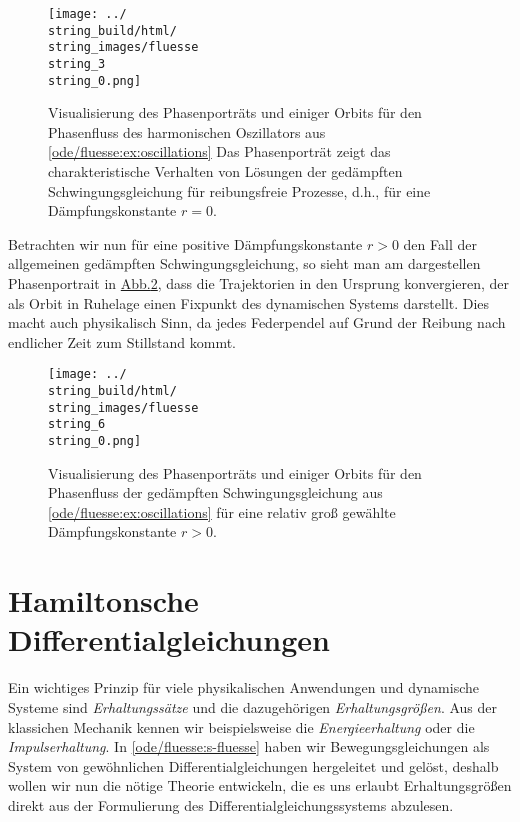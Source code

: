\documentclass[letterpaper,10pt,german]{jupyterBook}
\begin{document}
\begin{figure}[htbp]
\centering



\noindent\texttt{[image: ../\\string\_build/html/\\string\_images/fluesse\\string\_3\\string\_0.png]}

\caption{Visualisierung des Phasenporträts und einiger Orbits für den Phasenfluss des harmonischen Oszillators aus \cref{ode/fluesse:ex:oscillations}  Das Phasenporträt zeigt das charakteristische Verhalten von Lösungen der gedämpften Schwingungsgleichung für reibungsfreie Prozesse, d.h., für eine Dämpfungskonstante \(r = 0\).}\label{\detokenize{ode/fluesse:fig-harmonic-oscillator}}\end{figure}

\par
Betrachten wir nun für eine positive Dämpfungskonstante \(r > 0\) den Fall der allgemeinen gedämpften Schwingungsgleichung, so sieht man am dargestellen Phasenportrait in \hyperref[\detokenize{ode/fluesse:fig-damped-oscillator}]{Abb.\@ \ref{\detokenize{ode/fluesse:fig-damped-oscillator}}}, dass die Trajektorien in den Ursprung konvergieren, der als Orbit in Ruhelage einen Fixpunkt des dynamischen Systems darstellt.
Dies macht auch physikalisch Sinn, da jedes Federpendel auf Grund der Reibung nach endlicher Zeit zum Stillstand kommt.

\begin{figure}[htbp]
\centering



\noindent\texttt{[image: ../\\string\_build/html/\\string\_images/fluesse\\string\_6\\string\_0.png]}

\caption{Visualisierung des Phasenporträts und einiger Orbits für den Phasenfluss der gedämpften Schwingungsgleichung aus \cref{ode/fluesse:ex:oscillations} für eine relativ groß gewählte Dämpfungskonstante \(r > 0\).}\label{\detokenize{ode/fluesse:fig-damped-oscillator}}\end{figure}


\section{Hamiltonsche Differentialgleichungen}
\label{\detokenize{ode/hamilton:hamiltonsche-differentialgleichungen}}\label{\detokenize{ode/hamilton::doc}}
\par
Ein wichtiges Prinzip für viele physikalischen Anwendungen und dynamische Systeme sind \emph{Erhaltungssätze} und die dazugehörigen \emph{Erhaltungsgrößen}.
Aus der klassichen Mechanik kennen wir beispielsweise die \emph{Energieerhaltung} oder die \emph{Impulserhaltung}.
In \cref{ode/fluesse:s-fluesse}  haben wir Bewegungsgleichungen als System von gewöhnlichen Differentialgleichungen hergeleitet und gelöst, deshalb wollen wir nun die nötige Theorie entwickeln, die es uns erlaubt Erhaltungsgrößen direkt aus der Formulierung des Differentialgleichungssystems abzulesen.
\end{document}
